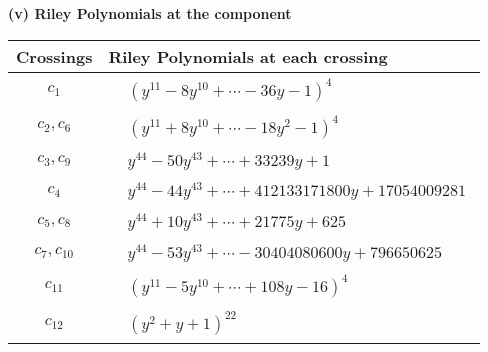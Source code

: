 \documentclass[1p]{elsarticle_modified}
\theoremstyle{definition}
\begin{document}
\newpage\renewcommand{\arraystretch}{1}
\flushleft \textbf{(v) Riley Polynomials at the component}\newline \\
\begin{tabular}{m{50pt}|m{274pt}}
Crossings & \hspace{64pt}Riley Polynomials at each crossing \\
\hline $$\begin{aligned}c_{1}\end{aligned}$$&$\begin{aligned}
&(y^{11}-8 y^{10}+\cdots-36 y-1)^{4}
\end{aligned}$\\
\hline $$\begin{aligned}c_{2},c_{6}\end{aligned}$$&$\begin{aligned}
&(y^{11}+8 y^{10}+\cdots-18 y^2-1)^{4}
\end{aligned}$\\
\hline $$\begin{aligned}c_{3},c_{9}\end{aligned}$$&$\begin{aligned}
&y^{44}-50 y^{43}+\cdots+33239 y+1
\end{aligned}$\\
\hline $$\begin{aligned}c_{4}\end{aligned}$$&$\begin{aligned}
&y^{44}-44 y^{43}+\cdots+412133171800 y+17054009281
\end{aligned}$\\
\hline $$\begin{aligned}c_{5},c_{8}\end{aligned}$$&$\begin{aligned}
&y^{44}+10 y^{43}+\cdots+21775 y+625
\end{aligned}$\\
\hline $$\begin{aligned}c_{7},c_{10}\end{aligned}$$&$\begin{aligned}
&y^{44}-53 y^{43}+\cdots-30404080600 y+796650625
\end{aligned}$\\
\hline $$\begin{aligned}c_{11}\end{aligned}$$&$\begin{aligned}
&(y^{11}-5 y^{10}+\cdots+108 y-16)^{4}
\end{aligned}$\\
\hline $$\begin{aligned}c_{12}\end{aligned}$$&$\begin{aligned}
&(y^2+y+1)^{22}
\end{aligned}$\\
\hline
\end{tabular}\\~\\
\end{document}
